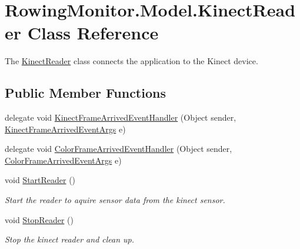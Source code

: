 \hypertarget{class_rowing_monitor_1_1_model_1_1_kinect_reader}{}\section{Rowing\+Monitor.\+Model.\+Kinect\+Reader Class Reference}
\label{class_rowing_monitor_1_1_model_1_1_kinect_reader}


The \hyperlink{class_rowing_monitor_1_1_model_1_1_kinect_reader}{Kinect\+Reader} class connects the application to the Kinect device.  


\subsection*{Public Member Functions}
\begin{DoxyCompactItemize}
\item 
delegate void \hyperlink{class_rowing_monitor_1_1_model_1_1_kinect_reader_ae6568e9b233e8878ac21662617702571}{Kinect\+Frame\+Arrived\+Event\+Handler} (Object sender, \hyperlink{class_rowing_monitor_1_1_model_1_1_kinect_frame_arrived_event_args}{Kinect\+Frame\+Arrived\+Event\+Args} e)
\item 
delegate void \hyperlink{class_rowing_monitor_1_1_model_1_1_kinect_reader_a2c9c0a937275cbabf12954725b54ddb8}{Color\+Frame\+Arrived\+Event\+Handler} (Object sender, \hyperlink{class_rowing_monitor_1_1_model_1_1_color_frame_arrived_event_args}{Color\+Frame\+Arrived\+Event\+Args} e)
\item 
void \hyperlink{class_rowing_monitor_1_1_model_1_1_kinect_reader_af76563a9cdbb0c9a7a748306bfc37a0d}{Start\+Reader} ()
\begin{DoxyCompactList}\small\item\em Start the reader to aquire sensor data from the kinect sensor. \end{DoxyCompactList}\item 
void \hyperlink{class_rowing_monitor_1_1_model_1_1_kinect_reader_a1a5359fcef4c052f7d6c27ae1eeda286}{Stop\+Reader} ()
\begin{DoxyCompactList}\small\item\em Stop the kinect reader and clean up. \end{DoxyCompactList}\end{DoxyCompactItemize}
